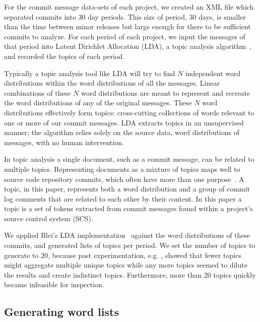 \documentclass[]{sig-alternate}
\begin{document}
For the commit message data-sets of each project, we created an XML file which separated commits into 30 day periods. 
This size of period, 30 days, is smaller than the time between minor releases but large enough for there to be sufficient commits to analyze. 
For each period of each project, we input the messages of that period into Latent Dirichlet Allocation (LDA), a topic analysis algorithm~\cite{Blei2003}, and recorded the topics of each period.

Typically a topic analysis tool like LDA will try to find $N$ independent word distributions within the word distributions of all the messages. 
Linear combinations of these $N$ word distributions are meant to represent and recreate the word distributions of any of the original messages. 
These $N$ word distributions effectively form topics: cross-cutting collections of words relevant to one or more of our commit messages. 
LDA extracts topics in an unsupervised manner; the algorithm relies solely on the source data, word distributions of messages, with no human intervention.

In topic analysis a single document, such as a commit message, can be related to multiple topics. 
Representing documents as a mixture of topics maps well to source code repository commits, which often have more than one purpose~\cite{Hindle09ICSM}.  
A topic, in this paper, represents both a word distribution and a group of commit log comments that are related to each other by their content.  
In this paper a topic is a set of tokens extracted from commit messages found within a project's source control system (SCS).

We applied Blei's LDA implementation~\cite{Blei2003} against the word distributions of these commits, and generated lists of topics per period. 
We set the number of topics to generate to $20$, because past experimentation, e.g. \cite{Hindle09ICSM}, showed that fewer topics might aggregate multiple unique topics while any more topics seemed to dilute the results and create indistinct topics. 
Furthermore, more than $20$ topics quickly became infeasible for inspection.


\subsection{Generating word lists}
\label{sec:genwordlist}
\end{document}
